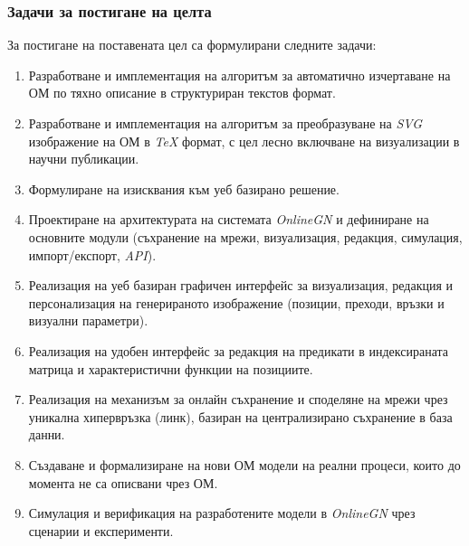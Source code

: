 \subsubsection{Задачи за постигане на целта}
\hspace*{2.5em}За постигане на поставената цел са формулирани следните задачи:

\vspace{-0.2cm}

\begin{enumerate}[
	label=\textbf{Задача \arabic*.}, 
	ref=Задача \arabic*,            
	leftmargin=2.5em,
	labelsep=0.8em,
	align=left
	]
\item Разработване и имплементация на алгоритъм за автоматично изчертаване на ОМ по тяхно описание в структуриран текстов формат.
\label{task:auto-draw}

\item Разработване и имплементация на алгоритъм за преобразуване на \textit{SVG} изображение на ОМ в \textit{TeX} формат, с цел лесно включване на визуализации в научни публикации.
\label{task:svg-to-tex}

\item Формулиране на изисквания към уеб базирано решение.
\label{task:requirements}

\item Проектиране на архитектурата на системата \textit{OnlineGN} и дефиниране на основните модули (съхранение на мрежи, визуализация, редакция, симулация, импорт/експорт, \textit{API}).
\label{task:architecture}

\item Реализация на уеб базиран графичен интерфейс за визуализация, редакция и персонализация на генерираното изображение (позиции, преходи, връзки и визуални параметри).
\label{task:web-ui}

\item Реализация на удобен интерфейс за редакция на предикати в индексираната матрица и характеристични функции на позициите.
\label{task:predicates-ui}

\item Реализация на механизъм за онлайн съхранение и споделяне на мрежи чрез уникална хипервръзка (линк), базиран на централизирано съхранение в база данни.
\label{task:share-storage}

\item Създаване и формализиране на нови ОМ модели на реални процеси, които до момента не са описвани чрез ОМ.
\label{task:new-models}

\item Симулация и верификация на разработените модели в \textit{OnlineGN} чрез сценарии и експерименти.
\label{task:simulation}
\end{enumerate}

